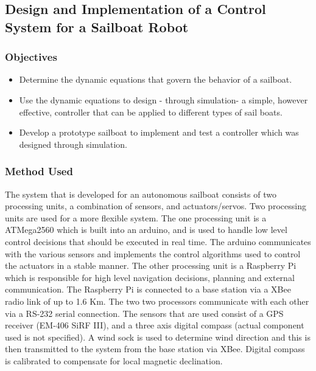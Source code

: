 \subsection{Design and Implementation of a Control System for a
Sailboat Robot}
\label{sec:robotics-paper}

\subsubsection{Objectives}
\begin{itemize}
    \item Determine the dynamic equations that govern the behavior of a sailboat.
    \item Use the dynamic equations to design - through simulation- a simple, however effective, controller that can be applied to different types of sail boats.
    \item Develop a prototype sailboat to implement and test a controller which was designed through simulation.
\end{itemize}

\subsubsection{Method Used}

The system that is developed for an autonomous sailboat consists of two processing units, a combination of sensors, and actuators/servos. Two processing units are used for a more 
flexible system. The one processing unit is a ATMega2560 which is built into an arduino, and is used to handle low level control decisions that should be executed in real time. 
The arduino communicates with the various sensors and implements the control algorithms used to control the actuators in a stable manner. The other processing unit is a Raspberry 
Pi which is responsible for high level navigation decisions, planning and external communication. The Raspberry Pi is connected to a base station via a XBee radio link of up to 1.6 Km. 
The two two processors communicate with each other via a RS-232 serial connection. The sensors that are used consist of a GPS receiver (EM-406 SiRF III), and a three axis digital compass 
(actual component used is not specified). A wind sock is used to determine wind direction and this is then transmitted to the system from the base station via XBee. Digital compass
is calibrated to compensate for local magnetic declination. 


